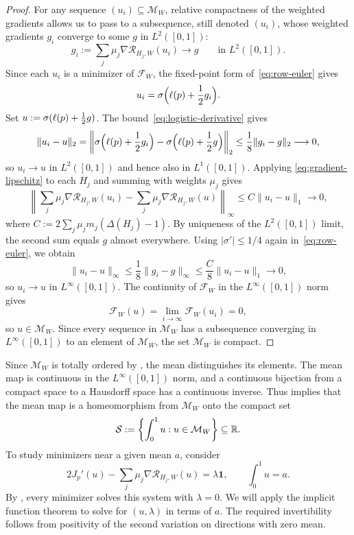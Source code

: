 \begin{proof}
For any sequence $(u_i)\subseteq\mathcal M_W$, relative compactness of the
weighted gradients allows us to pass to a subsequence, still denoted $(u_i)$,
whose weighted gradients $g_i$ converge to some $g$ in $L^2([0,1])$:
\[
  g_i:=\sum_j\mu_j\nabla\mathcal R_{H_j,W}(u_i)\longrightarrow g\qquad\text{in }L^2([0,1]).
\]
Since each $u_i$ is a minimizer of $\mathcal F_W$,
the fixed-point form of~\eqref{eq:row-euler} gives
\[
  u_i=\sigma\Bigl(\ell(p)+\frac12g_i\Bigr).
\]
Set $u:=\sigma(\ell(p)+\frac12g)$.  The bound~\eqref{eq:logistic-derivative} gives
\[
  \|u_i-u\|_2
  =\left\|\sigma\Bigl(\ell(p)+\frac12g_i\Bigr)-\sigma\Bigl(\ell(p)+\frac12g\Bigr)\right\|_2
  \le \frac{1}{8}\|g_i-g\|_2 \longrightarrow 0,
\]
so $u_i\to u$ in $L^2([0,1])$ and hence also in $L^1([0,1])$.
Applying \eqref{eq:gradient-lipschitz} to each $H_j$ and summing with weights $\mu_j$ gives
\[
  \left\|\sum_j\mu_j\nabla\mathcal R_{H_j,W}(u_i)
       -\sum_j\mu_j\nabla\mathcal R_{H_j,W}(u)\right\|_\infty
  \le C\|u_i-u\|_1\longrightarrow0,
\]
where $C:=2\sum_j\mu_jm_j(\Delta(H_j)-1)$.
By uniqueness of the $L^2([0,1])$ limit, the second sum equals $g$ almost everywhere.
Using $|\sigma'| \le 1/4$ again in~\eqref{eq:row-euler}, we obtain
\[
  \|u_i-u\|_\infty\le \frac{1}{8}\|g_i-g\|_\infty
  \le \frac C8\|u_i-u\|_1\longrightarrow0,
\]
so $u_i\to u$ in $L^\infty([0,1])$.
The continuity of $\mathcal F_W$ in the $L^\infty([0,1])$ norm gives
\[
  \mathcal F_W(u)=\lim_{i\to\infty}\mathcal F_W(u_i)=0,
\]
so $u\in\mathcal M_W$.
Since every sequence in $\mathcal M_W$ has a subsequence converging in $L^\infty([0,1])$ to an element of $\mathcal M_W$,
the set $\mathcal M_W$ is compact.
\end{proof}

Since $\mathcal M_W$ is totally ordered by ,
the mean distinguishes its elements.  The mean map is continuous in the
$L^\infty([0,1])$ norm, and a continuous bijection from a compact space to a
Hausdorff space has a continuous inverse.  Thus 
implies that the mean map is a homeomorphism from $\mathcal M_W$ onto the compact set
\[
  \mathcal S:=\left\{\int_0^1u:u\in\mathcal M_W\right\}\subseteq\mathbb R.
\]
To study minimizers near a given mean $a$, consider
\begin{equation}\label{eq:row-prescribed-mean}
  2J_p'(u)-\sum_j\mu_j\nabla\mathcal R_{H_j,W}(u)=\lambda\mathbf1,
  \qquad \int_0^1u=a.
\end{equation}
By , every minimizer solves this system with $\lambda=0$.
We will apply the implicit function theorem to solve for $(u,\lambda)$
in terms of $a$.  The required invertibility follows from positivity
of the second variation on directions with zero mean.

